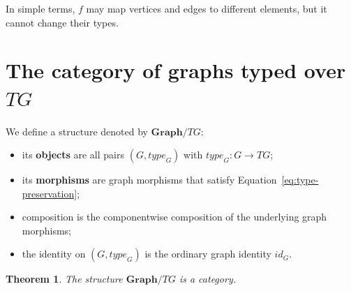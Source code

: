 \documentclass[10pt,a4paper]{article}
\newtheorem{theorem}{Theorem}
\theoremstyle{definition}
\newcommand{\Graph}{\mathbf{Graph}}
\newcommand{\TG}{\mathit{TG}}
\newcommand{\type}{\mathit{type}}
\newcommand{\id}{\mathit{id}}
\begin{document}
In simple terms, $f$ may map vertices and edges to different elements, but it
cannot change their types.

\section{The category of graphs typed over $\TG$}

We define a structure denoted by $\Graph/\TG$:

\begin{itemize}[leftmargin=2em]
    \item its \textbf{objects} are all pairs $(G,\type_G)$ with
          $\type_G:G\to\TG$;
    \item its \textbf{morphisms} are graph morphisms that satisfy
          Equation~\ref{eq:type-preservation};
    \item composition is the componentwise composition of the underlying
          graph morphisms;
    \item the identity on $(G,\type_G)$ is the ordinary graph identity
          $\id_G$.
\end{itemize}

\begin{theorem}
The structure $\Graph/\TG$ is a category.
\end{theorem}
\end{document}

